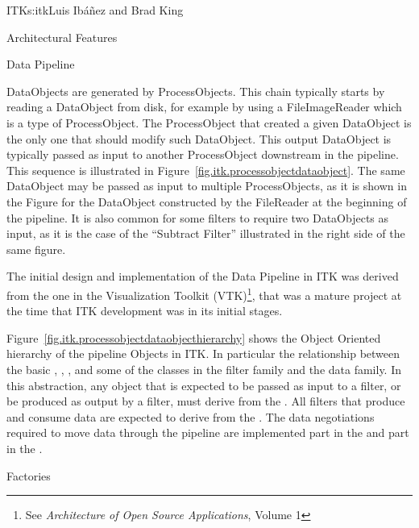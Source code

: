 \begin{aosachapter}{ITK}{s:itk}{Luis Ib\'{a}\~{n}ez and Brad King}
\begin{aosasect1}{Architectural Features}
\begin{aosasect2}{Data Pipeline}

DataObjects are generated by ProcessObjects. This chain typically starts by
reading a DataObject from disk, for example by using a FileImageReader which is
a type of ProcessObject. The ProcessObject that created a given DataObject is
the only one that should modify such DataObject. This output DataObject is
typically passed as input to another ProcessObject downstream in the pipeline.
This sequence is illustrated in Figure~\ref{fig.itk.processobjectdataobject}.
The same DataObject may be passed as input to multiple ProcessObjects, as it is
shown in the Figure for the DataObject constructed by the FileReader at the
beginning of the pipeline. It is also common for some filters to require two
DataObjects as input, as it is the case of the ``Subtract Filter'' illustrated
in the right side of the same figure.

The initial design and implementation of the Data Pipeline in ITK was derived
from the one in the Visualization Toolkit (VTK)\footnote{See \emph{Architecture
of Open Source Applications}, Volume 1}, that was a mature project at the time
that ITK development was in its initial stages.

Figure~\ref{fig.itk.processobjectdataobjecthierarchy} shows the Object Oriented
hierarchy of the pipeline Objects in ITK. In particular the relationship
between the basic , , , and
some of the classes in the filter family and the data family. In this
abstraction, any object that is expected to be passed as input to a filter, or
be produced as output by a filter, must derive from the . All
filters that produce and consume data are expected to derive from the
. The data negotiations required to move data through the
pipeline are implemented part in the  and part in the
.


\end{aosasect2}

\begin{aosasect2}{Factories}


\end{aosasect2}
\end{aosasect1}
\end{aosachapter}
